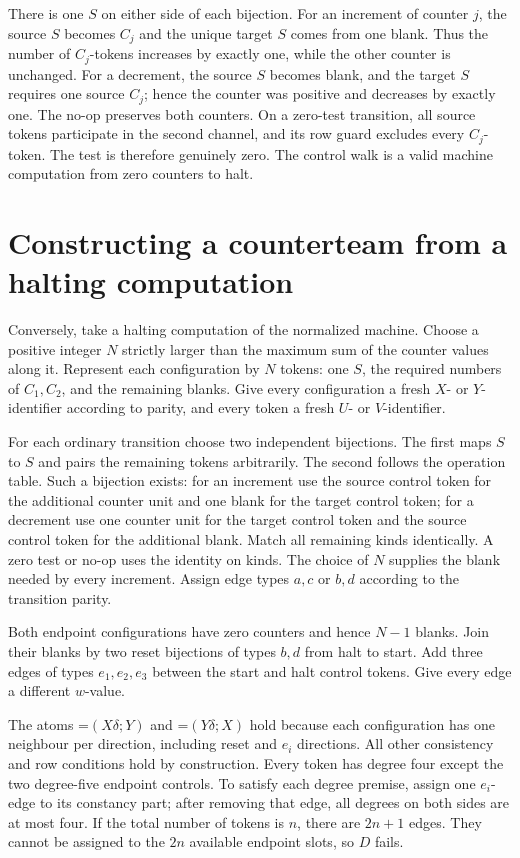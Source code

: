 \documentclass[11pt,a4paper]{article}
\newcommand{\dep}[2]{\mathord{=}(#1;#2)}
\theoremstyle{definition}
\begin{document}
There is one $S$ on either side of each bijection. For an increment
of counter $j$, the source $S$ becomes $C_j$ and the unique target
$S$ comes from one blank. Thus the number of $C_j$-tokens increases
by exactly one, while the other counter is unchanged. For a decrement,
the source $S$ becomes blank, and the target $S$ requires one source
$C_j$; hence the counter was positive and decreases by exactly one.
The no-op preserves both counters. On a zero-test transition, all
source tokens participate in the second channel, and its row guard
excludes every $C_j$-token. The test is therefore genuinely zero.
The control walk is a valid machine computation from zero counters
to halt.

\section{Constructing a counterteam from a halting computation}
\label{sec:completeness}
Conversely, take a halting computation of the normalized machine.
Choose a positive integer $N$ strictly larger than the maximum sum
of the counter values along it. Represent each configuration by $N$
tokens: one $S$, the required numbers of $C_1,C_2$, and the remaining
blanks. Give every configuration a fresh $X$- or $Y$-identifier
according to parity, and every token a fresh $U$- or $V$-identifier.

For each ordinary transition choose two independent bijections.
The first maps $S$ to $S$ and pairs the remaining tokens arbitrarily.
The second follows the operation table. Such a bijection exists:
for an increment use the source control token for the additional
counter unit and one blank for the target control token; for a
decrement use one counter unit for the target control token and
the source control token for the additional blank. Match all remaining
kinds identically. A zero test or no-op uses the identity on kinds.
The choice of $N$ supplies the blank needed by every increment.
Assign edge types $a,c$ or $b,d$ according to the transition parity.

Both endpoint configurations have zero counters and hence $N-1$
blanks. Join their blanks by two reset bijections of types $b,d$
from halt to start. Add three edges of types $e_1,e_2,e_3$ between
the start and halt control tokens. Give every edge a different
$w$-value.

The atoms $\dep{X\delta}Y$ and $\dep{Y\delta}X$ hold because each configuration has
one neighbour per direction, including reset and $e_i$ directions.
All other consistency and row conditions hold by construction.
Every token has degree four except the two degree-five endpoint
controls. To satisfy each degree premise, assign one $e_i$-edge
to its constancy part; after removing that edge, all degrees on
both sides are at most four. If the total number of tokens is $n$,
there are $2n+1$ edges. They cannot be assigned to the $2n$ available
endpoint slots, so $D$ fails.
\end{document}
